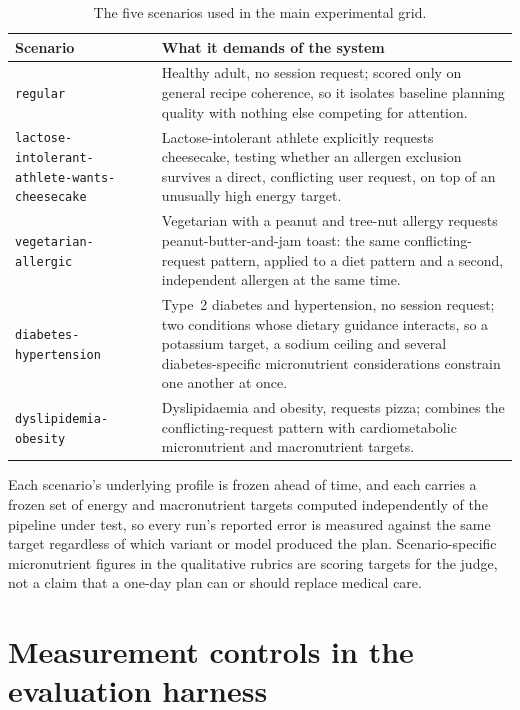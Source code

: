 \begin{table}[htbp]
    \centering
    \begin{tabular}{>{\raggedright\arraybackslash}p{}p{}}
        \toprule
        Scenario & What it demands of the system \\
        \midrule
        \texttt{regular} & Healthy adult, no session request; scored only on general recipe coherence, so it isolates baseline planning quality with nothing else competing for attention. \\
        \texttt{lactose-\allowbreak intolerant-\allowbreak athlete-\allowbreak wants-\allowbreak cheesecake} & Lactose-intolerant athlete explicitly requests cheesecake, testing whether an allergen exclusion survives a direct, conflicting user request, on top of an unusually high energy target. \\
        \texttt{vegetarian-allergic} & Vegetarian with a peanut and tree-nut allergy requests peanut-butter-and-jam toast: the same conflicting-request pattern, applied to a diet pattern and a second, independent allergen at the same time. \\
        \texttt{diabetes-hypertension} & Type~2 diabetes and hypertension, no session request; two conditions whose dietary guidance interacts, so a potassium target, a sodium ceiling and several diabetes-specific micronutrient considerations constrain one another at once. \\
        \texttt{dyslipidemia-obesity} & Dyslipidaemia and obesity, requests pizza; combines the conflicting-request pattern with cardiometabolic micronutrient and macronutrient targets. \\
        \bottomrule
    \end{tabular}
    \caption{The five scenarios used in the main experimental grid.}
    \label{tab:methodology-scenarios}
\end{table}

Each scenario's underlying profile is frozen ahead of time, and each carries a frozen set of energy and macronutrient targets computed independently of the pipeline under test, so every run's reported error is measured against the same target regardless of which variant or model produced the plan. Scenario-specific micronutrient figures in the qualitative rubrics are scoring targets for the judge, not a claim that a one-day plan can or should replace medical care.

\section{Measurement controls in the evaluation harness}
\label{sec:methodology-harness}

